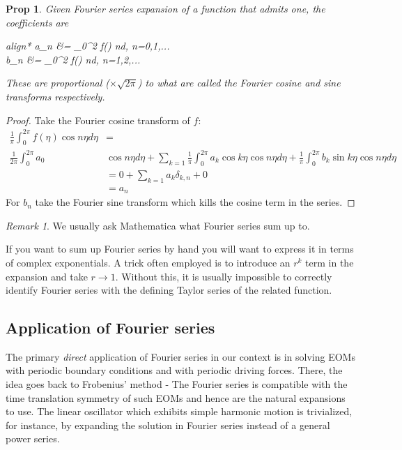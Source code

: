\documentclass{article}
\newtheorem*{proposition}{Prop}
\theoremstyle{definition}
\theoremstyle{remark}
\newtheorem*{remark}{Remark}
\theoremstyle{remark}
\begin{document}
\begin{proposition}
	Given Fourier series expansion of a function that admits one, the coefficients are 
	\begin{empheq}[box=\tcbhighmath]{align*}
   	a_n &= \int_{0}^{2\pi} f(\eta) \cos n\eta d\eta, \hspace{2mm}n=0,1,...\\
   	b_n &= \int_{0}^{2\pi} f(\eta) \sin n\eta d\eta, \hspace{2mm}n=1,2,...
\end{empheq}
These are proportional ($\times \sqrt{2\pi}$) to what are called the Fourier cosine and sine transforms respectively.
\end{proposition}
\begin{proof}
	Take the Fourier cosine transform of $f$:
	\begin{align*}
		\frac{1}{\pi}\int_0^{2\pi}f(\eta)\cos n\eta d\eta &= \\
		\frac{1}{2\pi}\int_0^{2\pi}a_0 &\cos n\eta d\eta+\sum_{k=1}\frac{1}{\pi}\int_0^{2\pi}a_k\cos k\eta\cos n\eta d\eta+\frac{1}{\pi}\int_0^{2\pi}b_k\sin k\eta\cos n\eta d\eta\\
		&=0+\sum_{k=1}a_k\delta_{k,n}+0\\
		&=a_n
	\end{align*}
	For $b_n$ take the Fourier sine transform which kills the cosine term in the series. 
	
\end{proof}
\begin{remark}
	We usually ask Mathematica what Fourier series sum up to.

	If you want to sum up Fourier series by hand you will want to express it in terms of complex exponentials. A trick often employed is to introduce an $r^{k}$ term in the expansion and take $r\to 1$. Without this, it is usually impossible to correctly identify Fourier series with the defining Taylor series of the related function.  
\end{remark}

\subsection*{Application of Fourier series}

The primary \emph{direct} application of Fourier series in our context is in solving EOMs with periodic boundary conditions and with periodic driving forces. There, the idea goes back to Frobenius' method - The Fourier series is compatible with the time translation symmetry of such EOMs and hence are the natural expansions to use. The linear oscillator which exhibits simple harmonic motion is trivialized, for instance, by expanding the solution in Fourier series instead of a general power series.
\end{document}
